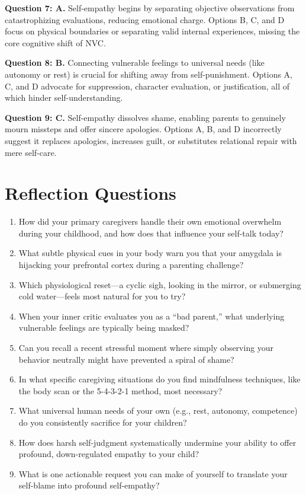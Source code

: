 \begin{practiceexercise}
\textbf{Question 7: A.} Self-empathy begins by separating objective observations from catastrophizing evaluations, reducing emotional charge. Options B, C, and D focus on physical boundaries or separating valid internal experiences, missing the core cognitive shift of NVC.

\textbf{Question 8: B.} Connecting vulnerable feelings to universal needs (like autonomy or rest) is crucial for shifting away from self-punishment. Options A, C, and D advocate for suppression, character evaluation, or justification, all of which hinder self-understanding.

\textbf{Question 9: C.} Self-empathy dissolves shame, enabling parents to genuinely mourn missteps and offer sincere apologies. Options A, B, and D incorrectly suggest it replaces apologies, increases guilt, or substitutes relational repair with mere self-care.
\vspace{\fill}
\end{practiceexercise}

\newpage
\section{Reflection Questions}
\begin{reflection}
\small
\begin{enumerate}[itemsep=0pt, parsep=0pt, topsep=0pt]
  \item How did your primary caregivers handle their own emotional overwhelm during your childhood, and how does that influence your self-talk today?
  \item What subtle physical cues in your body warn you that your amygdala is hijacking your prefrontal cortex during a parenting challenge?
  \item Which physiological reset---a cyclic sigh, looking in the mirror, or submerging cold water---feels most natural for you to try?
  \item When your inner critic evaluates you as a ``bad parent,'' what underlying vulnerable feelings are typically being masked?
  \item Can you recall a recent stressful moment where simply observing your behavior neutrally might have prevented a spiral of shame?
  \item In what specific caregiving situations do you find mindfulness techniques, like the body scan or the 5-4-3-2-1 method, most necessary?
  \item What universal human needs of your own (e.g., rest, autonomy, competence) do you consistently sacrifice for your children?
  \item How does harsh self-judgment systematically undermine your ability to offer profound, down-regulated empathy to your child?
  \item What is one actionable request you can make of yourself to translate your self-blame into profound self-empathy?
\end{enumerate}
\end{reflection}
